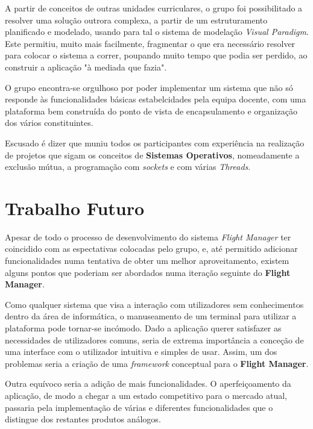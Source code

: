 \documentclass[a4paper,11pt]{scrreprt}
\begin{document}
A partir de conceitos de outras unidades curriculares, o grupo foi possibilitado a resolver uma 
solução outrora complexa, a partir de um estruturamento planificado e modelado, usando para tal 
o sistema de modelação \textit{Visual Paradigm}.
Este permitiu, muito mais facilmente, fragmentar o que era necessário resolver para colocar o 
sistema a correr, poupando muito tempo que podia ser perdido, ao construir a aplicação "à mediada
que fazia".

O grupo encontra-se orgulhoso por poder implementar um sistema que não só responde às funcionalidades 
básicas estabelcidades pela equipa docente, com uma plataforma bem construída do ponto de vista
de encapsulamento e organização dos vários constituintes.

Escusado é dizer que muniu todos os participantes com experiência na realização de projetos que sigam 
os conceitos de \textbf{Sistemas Operativos}, nomeadamente a exclusão mútua, a programação com \textit{sockets} e
com várias \textit{Threads}.

\section{Trabalho Futuro}

Apesar de todo o processo de desenvolvimento do sistema \textit{Flight Manager} ter coincidido com as espectativas
colocadas pelo grupo, e, até permitido adicionar funcionalidades numa tentativa de obter um melhor aproveitamento,
existem alguns pontos que poderiam ser abordados numa iteração seguinte do \textbf{Flight Manager}.

Como qualquer sistema que visa a interação com utilizadores sem conhecimentos dentro da área de informática, o 
manuseamento de um terminal para utilizar a plataforma pode tornar-se incómodo.
Dado a aplicação querer satisfazer as necessidades de utilizadores comuns, seria de extrema importância a conceção
de uma interface com o utilizador intuitiva e simples de usar.
Assim, um dos problemas seria a criação de uma \textit{framework} conceptual para o \textbf{Flight Manager}.

Outra equívoco seria a adição de mais funcionalidades. 
O aperfeiçoamento da aplicação, de modo a chegar a um estado competitivo para o mercado atual, passaria pela
implementação de várias e diferentes funcionalidades que o distingue dos restantes produtos análogos.


\printbibliography
\end{document}
